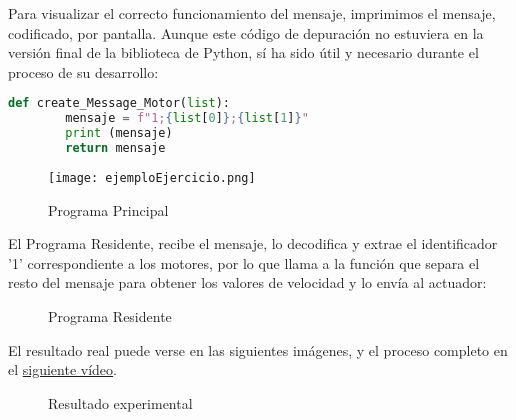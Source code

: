 Para visualizar el correcto funcionamiento del mensaje, imprimimos el mensaje, codificado, por pantalla. Aunque este código de depuración no estuviera en la versión final de la biblioteca de Python, sí ha sido útil y necesario durante el proceso de su desarrollo:

\begin{lstlisting}[language=python,caption={Uso de la bibliotca durante su desarrollo, con depuración de código},captionpos=b]
	def create_Message_Motor(list):
		mensaje = f"1;{list[0]};{list[1]}"
		print (mensaje)
		return mensaje
\end{lstlisting}

\begin{figure}[h]
	\centering
	\texttt{[image: ejemploEjercicio.png]}
	\label{img:ProgramaPrincipal}
	\caption{Programa Principal}
\end{figure} 
 
El Programa Residente, recibe el mensaje, lo decodifica y extrae el identificador '1' correspondiente a los motores, por lo que llama a la función que separa el resto del mensaje para obtener los valores de velocidad y lo envía al actuador:

\begin{figure}[H]
	\centering
	\begin{subfigure}
		[Extraer el identificador]{
			\texttt{[image: ejemploEjercicio2.png]}
			\label{img:ejemplo2}}
	\end{subfigure}
	\begin{subfigure}
		[Decodificar mensaje completo]{
			\texttt{[image: ejemploEjercicio3.png]}
			\label{img:ejemplo3}}
	\end{subfigure}
	\label{img:ProgramaResidente}
	\caption{Programa Residente}
\end{figure}

El resultado real puede verse en las siguientes imágenes, y el proceso completo en el \href{https://www.youtube.com/watch?v=GbFC0OJPLk0}{siguiente vídeo}.


\begin{figure}[H]
	\centering
	\begin{subfigure}[b]
		[Ejecución programa Principal]{
			\centering
			\texttt{[image: ejemploEjercicio4.png]}
			\label{img:ejemplo4}}
	\end{subfigure}
\newline
	\begin{subfigure}[b]
		[mBot]{
			\centering
			\texttt{[image: ejemploEjercicio5.png]}
			\label{img:ejemplo5}}
	\end{subfigure}
	\label{img:Resultadoexperimental}
	\caption{Resultado experimental}
\end{figure}
